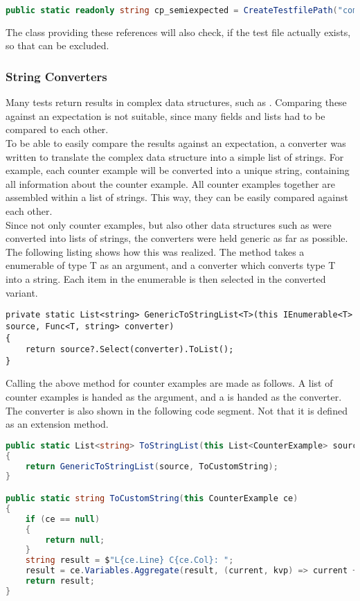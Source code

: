 \begin{lstlisting}[language=csharp, caption={Test File Reference}, captionpos=b, label={lst:fileRef}]
public static readonly string cp_semiexpected = CreateTestfilePath("compile/semi_expected_error.dfy");
\end{lstlisting}
The class providing these references will also check, if the test file actually exists, so that  can be excluded.

\subsubsection{String Converters}
Many tests return results in complex data structures, such as . Comparing these against an expectation is not suitable, since many fields and lists had to be compared to each other.\\
To be able to easily compare the results against an expectation, a converter was written to translate the complex data structure into a simple list of strings. For example, each counter example will be converted into a unique string, containing all information about the counter example. All counter examples together are assembled within a list of strings. This way, they can be easily compared against each other.\\
Since not only counter examples, but also other data structures such as  were converted into lists of strings, the converters were held generic as far as possible. The following listing shows how this was realized. The method takes a enumerable of type T as an argument, and a converter which converts type T into a string. Each item in the enumerable is then selected in the converted variant.

\begin{lstlisting}[caption={Generic Method to Convert an IEnumerable}, captionpos=b, label={lst:fileRef}]
private static List<string> GenericToStringList<T>(this IEnumerable<T> source, Func<T, string> converter)
{
    return source?.Select(converter).ToList();
}
\end{lstlisting}

Calling the above method for counter examples are made as follows. A list of counter examples is handed as the argument, and a  is handed as the converter. The converter is also shown in the following code segment. Not that it is defined as an extension method.

\begin{lstlisting}[language=csharp, caption={Converting CounterExamples to strings}, captionpos=b, label={lst:fileRef}]
public static List<string> ToStringList(this List<CounterExample> source)
{
    return GenericToStringList(source, ToCustomString);
}

public static string ToCustomString(this CounterExample ce)
{
    if (ce == null)
    {
        return null;
    }
    string result = $"L{ce.Line} C{ce.Col}: ";
    result = ce.Variables.Aggregate(result, (current, kvp) => current + $"{kvp.Key} = {kvp.Value}; ");
    return result;
}
\end{lstlisting}

